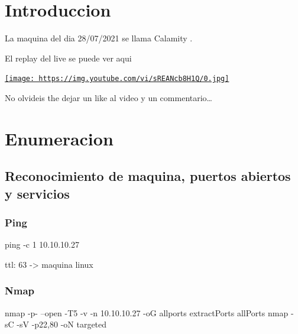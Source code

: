 \documentclass{assets/ipesethesis}
\newenvironment{Shaded}{\begin{snugshade}}{\end{snugshade}}
\newcommand{\ExtensionTok}[1]{#1}
\newcommand{\FunctionTok}[1]{\textcolor[rgb]{0.00,0.00,0.00}{#1}}
\newcommand{\NormalTok}[1]{#1}
\begin{document}
\hypertarget{introduccion-5}{%
\section*{Introduccion}\label{introduccion-5}}

La maquina del dia 28/07/2021 se llama Calamity
.

El replay del live se puede ver aqui

\href{https://www.youtube.com/watch?v=sREANcb8H1Q}{\texttt{[image: https://img.youtube.com/vi/sREANcb8H1Q/0.jpg]}}

No olvideis the dejar un like al video y un commentario\ldots{}

\hypertarget{enumeracion-5}{%
\section*{Enumeracion}\label{enumeracion-5}}

\hypertarget{reconocimiento-de-maquina-puertos-abiertos-y-servicios-5}{%
\subsection*{Reconocimiento de maquina, puertos abiertos y servicios}\label{reconocimiento-de-maquina-puertos-abiertos-y-servicios-5}}

\hypertarget{ping-5}{%
\subsubsection*{Ping}\label{ping-5}}

\begin{Shaded}
\begin{Highlighting}[]
\FunctionTok{ping}\NormalTok{ -c 1 10.10.10.27}
\end{Highlighting}
\end{Shaded}

ttl: 63 -\textgreater{} maquina linux

\hypertarget{nmap-5}{%
\subsubsection*{Nmap}\label{nmap-5}}

\begin{Shaded}
\begin{Highlighting}[]
\FunctionTok{nmap}\NormalTok{ -p- --open -T5 -v -n 10.10.10.27 -oG allports}
\ExtensionTok{extractPorts}\NormalTok{ allPorts}
\FunctionTok{nmap}\NormalTok{ -sC -sV -p22,80 -oN targeted}
\end{Highlighting}
\end{Shaded}
\end{document}
